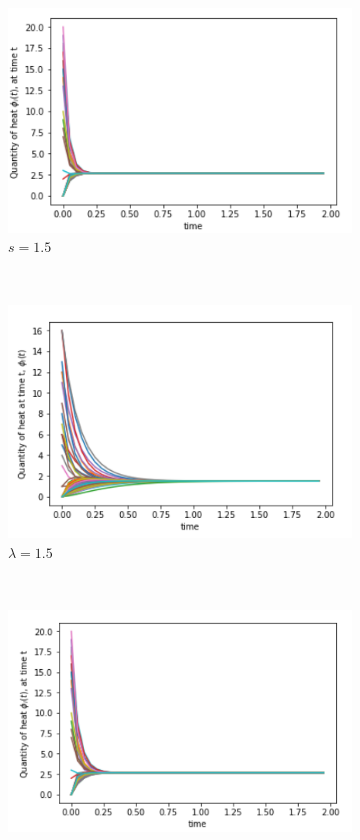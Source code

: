 \documentclass[10pt,a4paper]{article}
\theoremstyle{plain}
\theoremstyle{definition}
\begin{document}
        	\begin{figure}[H]
        	\centering
        	\begin{subfigure}[b]{0.45\textwidth}
        		\includegraphics[width=\textwidth]{images/Barabasi-Mellin15.png}
        		\caption{$s=1.5$}
        	\end{subfigure}~
        	\begin{subfigure}[b]{0.45\textwidth}
        		\includegraphics[width= \textwidth]{images/Barabasi-Laplace15.png}
        		\caption{$\lambda=1.5$}
        	\end{subfigure}\\
        	\begin{subfigure}[b]{0.45\textwidth}
        		\includegraphics[width= \textwidth]{images/Barabasi-Mellin2.png}

\end{subfigure}
\end{figure}
\end{document}
